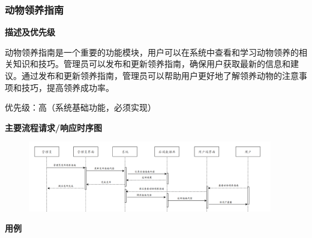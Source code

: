 \documentclass[12pt,a4paper,UTF8]{article}
\begin{document}
\subsubsection{动物领养指南}

\noindent\textbf{描述及优先级}

动物领养指南是一个重要的功能模块，用户可以在系统中查看和学习动物领养的相关知识和技巧。管理员可以发布和更新领养指南，确保用户获取最新的信息和建议。通过发布和更新领养指南，管理员可以帮助用户更好地了解领养动物的注意事项和技巧，提高领养成功率。

优先级：高（系统基础功能，必须实现）

\noindent\textbf{主要流程请求/响应时序图}

\begin{figure}[H]
  \centering
  \includegraphics[width=0.95\textwidth]{figures/use326.png} 
\end{figure}

\noindent\textbf{用例}
\end{document}
